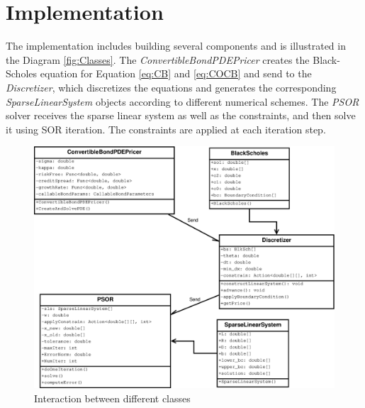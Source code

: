 \documentclass[12pt]{article}
\begin{document}
\section{Implementation}
The implementation includes building several components and is illustrated in the Diagram \ref{fig:Classes}. The \textit{ConvertibleBondPDEPricer} creates the Black-Scholes equation for Equation \ref{eq:CB} and \ref{eq:COCB} and send to the \textit{Discretizer}, which discretizes the equations and generates the corresponding \textit{SparseLinearSystem} objects according to different numerical schemes. The \textit{PSOR} solver receives the sparse linear system as well as the constraints, and then solve it using SOR iteration. The constraints are applied at each iteration step. 
\begin{figure}
\includegraphics[width=\textwidth]{Figures/CBobjects}
\caption{Interaction between different classes}
\end{figure}
\label{fig:Classes}
\end{document}
